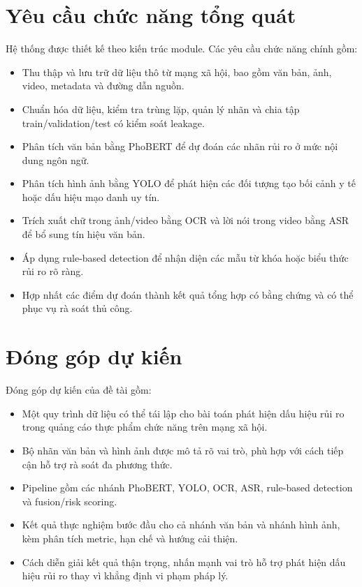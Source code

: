 \section{Yêu cầu chức năng tổng quát}
Hệ thống được thiết kế theo kiến trúc module. Các yêu cầu chức năng chính gồm:
\begin{itemize}
    \item Thu thập và lưu trữ dữ liệu thô từ mạng xã hội, bao gồm văn bản, ảnh, video, metadata và đường dẫn nguồn.
    \item Chuẩn hóa dữ liệu, kiểm tra trùng lặp, quản lý nhãn và chia tập train/validation/test có kiểm soát leakage.
    \item Phân tích văn bản bằng PhoBERT để dự đoán các nhãn rủi ro ở mức nội dung ngôn ngữ.
    \item Phân tích hình ảnh bằng YOLO để phát hiện các đối tượng tạo bối cảnh y tế hoặc dấu hiệu mạo danh uy tín.
    \item Trích xuất chữ trong ảnh/video bằng OCR và lời nói trong video bằng ASR để bổ sung tín hiệu văn bản.
    \item Áp dụng rule-based detection để nhận diện các mẫu từ khóa hoặc biểu thức rủi ro rõ ràng.
    \item Hợp nhất các điểm dự đoán thành kết quả tổng hợp có bằng chứng và có thể phục vụ rà soát thủ công.
\end{itemize}

\section{Đóng góp dự kiến}
Đóng góp dự kiến của đề tài gồm:
\begin{itemize}
    \item Một quy trình dữ liệu có thể tái lập cho bài toán phát hiện dấu hiệu rủi ro trong quảng cáo thực phẩm chức năng trên mạng xã hội.
    \item Bộ nhãn văn bản và hình ảnh được mô tả rõ vai trò, phù hợp với cách tiếp cận hỗ trợ rà soát đa phương thức.
    \item Pipeline gồm các nhánh PhoBERT, YOLO, OCR, ASR, rule-based detection và fusion/risk scoring.
    \item Kết quả thực nghiệm bước đầu cho cả nhánh văn bản và nhánh hình ảnh, kèm phân tích metric, hạn chế và hướng cải thiện.
    \item Cách diễn giải kết quả thận trọng, nhấn mạnh vai trò hỗ trợ phát hiện dấu hiệu rủi ro thay vì khẳng định vi phạm pháp lý.
\end{itemize}
